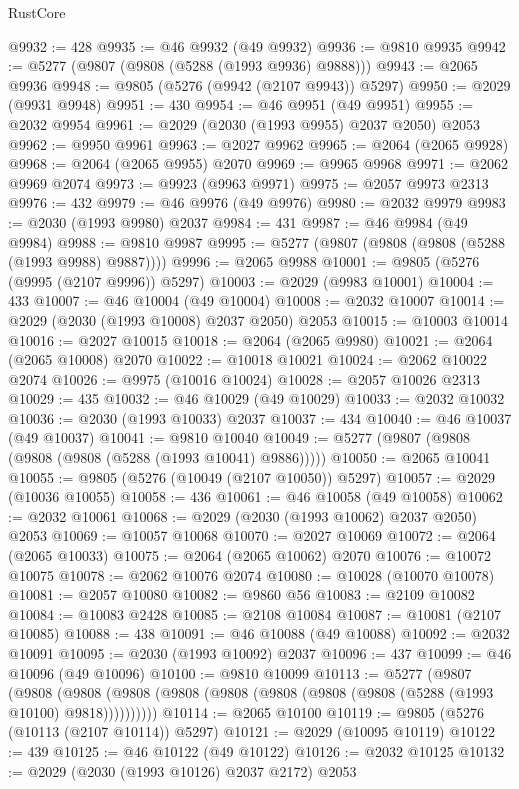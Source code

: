 \begin{lexlean}{RustCore}
\begin{coremodule}
@9932 := 428
@9935 := @46 @9932 (@49 @9932)
@9936 := @9810 @9935
@9942 := @5277 (@9807 (@9808 (@5288 (@1993 @9936) @9888)))
@9943 := @2065 @9936
@9948 := @9805 (@5276 (@9942 (@2107 @9943)) @5297)
@9950 := @2029 (@9931 @9948)
@9951 := 430
@9954 := @46 @9951 (@49 @9951)
@9955 := @2032 @9954
@9961 := @2029 (@2030 (@1993 @9955) @2037 @2050) @2053
@9962 := @9950 @9961
@9963 := @2027 @9962
@9965 := @2064 (@2065 @9928)
@9968 := @2064 (@2065 @9955) @2070
@9969 := @9965 @9968
@9971 := @2062 @9969 @2074
@9973 := @9923 (@9963 @9971)
@9975 := @2057 @9973 @2313
@9976 := 432
@9979 := @46 @9976 (@49 @9976)
@9980 := @2032 @9979
@9983 := @2030 (@1993 @9980) @2037
@9984 := 431
@9987 := @46 @9984 (@49 @9984)
@9988 := @9810 @9987
@9995 := @5277 (@9807 (@9808 (@9808 (@5288 (@1993 @9988) @9887))))
@9996 := @2065 @9988
@10001 := @9805 (@5276 (@9995 (@2107 @9996)) @5297)
@10003 := @2029 (@9983 @10001)
@10004 := 433
@10007 := @46 @10004 (@49 @10004)
@10008 := @2032 @10007
@10014 := @2029 (@2030 (@1993 @10008) @2037 @2050) @2053
@10015 := @10003 @10014
@10016 := @2027 @10015
@10018 := @2064 (@2065 @9980)
@10021 := @2064 (@2065 @10008) @2070
@10022 := @10018 @10021
@10024 := @2062 @10022 @2074
@10026 := @9975 (@10016 @10024)
@10028 := @2057 @10026 @2313
@10029 := 435
@10032 := @46 @10029 (@49 @10029)
@10033 := @2032 @10032
@10036 := @2030 (@1993 @10033) @2037
@10037 := 434
@10040 := @46 @10037 (@49 @10037)
@10041 := @9810 @10040
@10049 := @5277 (@9807 (@9808 (@9808 (@9808 (@5288 (@1993 @10041) @9886)))))
@10050 := @2065 @10041
@10055 := @9805 (@5276 (@10049 (@2107 @10050)) @5297)
@10057 := @2029 (@10036 @10055)
@10058 := 436
@10061 := @46 @10058 (@49 @10058)
@10062 := @2032 @10061
@10068 := @2029 (@2030 (@1993 @10062) @2037 @2050) @2053
@10069 := @10057 @10068
@10070 := @2027 @10069
@10072 := @2064 (@2065 @10033)
@10075 := @2064 (@2065 @10062) @2070
@10076 := @10072 @10075
@10078 := @2062 @10076 @2074
@10080 := @10028 (@10070 @10078)
@10081 := @2057 @10080
@10082 := @9860 @56
@10083 := @2109 @10082
@10084 := @10083 @2428
@10085 := @2108 @10084
@10087 := @10081 (@2107 @10085)
@10088 := 438
@10091 := @46 @10088 (@49 @10088)
@10092 := @2032 @10091
@10095 := @2030 (@1993 @10092) @2037
@10096 := 437
@10099 := @46 @10096 (@49 @10096)
@10100 := @9810 @10099
@10113 := @5277
    (@9807
      (@9808 (@9808 (@9808 (@9808 (@9808 (@9808 (@9808 (@9808 (@5288 (@1993 @10100) @9818))))))))))
@10114 := @2065 @10100
@10119 := @9805 (@5276 (@10113 (@2107 @10114)) @5297)
@10121 := @2029 (@10095 @10119)
@10122 := 439
@10125 := @46 @10122 (@49 @10122)
@10126 := @2032 @10125
@10132 := @2029 (@2030 (@1993 @10126) @2037 @2172) @2053

\end{coremodule}
\end{lexlean}
